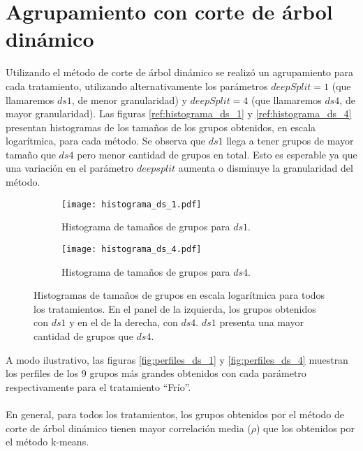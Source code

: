 \section{Agrupamiento con corte de árbol dinámico}
Utilizando el método de corte de árbol dinámico se realizó un agrupamiento para cada tratamiento, utilizando alternativamente los parámetros $deepSplit=1$ (que llamaremos $ds1$, de menor granularidad) y $deepSplit=4$ (que llamaremos $ds4$, de mayor granularidad). Las figuras \ref{ref:histograma_ds_1} y \ref{ref:histograma_ds_4} presentan histogramas de los tamaños de los grupos obtenidos, en escala logarítmica, para cada método. Se observa que $ds1$ llega a tener grupos de mayor tamaño que $ds4$ pero menor cantidad de grupos en total. Esto es esperable ya que una variación en el parámetro $deepsplit$ aumenta o disminuye la granularidad del método.\\
\begin{sidewaysfigure}[H]
    \centering
    \begin{subfigure}[t]{0.45\textwidth}
    \centering
    \texttt{[image: histograma\_ds\_1.pdf]}
    \caption{Histograma de tamaños de grupos para $ds1$.}
    \label{fig:histograma_ds_1}
    \end{subfigure}
    \begin{subfigure}[t]{0.45\textwidth}
    \centering
    \texttt{[image: histograma\_ds\_4.pdf]}
    \caption{Histograma de tamaños de grupos para $ds4$.}
    \label{fig:histograma_ds_4}
    \end{subfigure}
    \caption{Histogramas de tamaños de grupos en escala logarítmica para todos los tratamientos. En el panel de la izquierda, los grupos obtenidos con $ds1$ y en el de la derecha, con $ds4$. $ds1$ presenta una mayor cantidad de grupos que $ds4$.}
\end{sidewaysfigure}
A modo ilustrativo, las figuras \ref{fig:perfiles_ds_1} y \ref{fig:perfiles_ds_4} muestran los perfiles de los 9 grupos más grandes obtenidos con cada parámetro respectivamente para el tratamiento ``Frío''.\\\\ 
En general, para todos los tratamientos, los grupos obtenidos por el método de corte de árbol dinámico tienen mayor correlación media ($\rho$) que los obtenidos por el método k-means.\\\\
